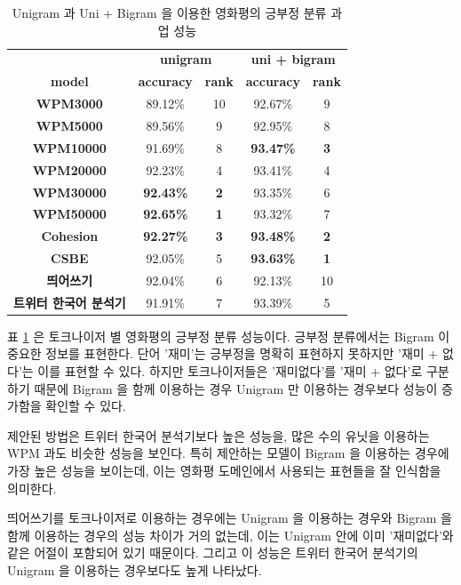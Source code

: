 \documentclass[oneside, ko,phd]{snuthesis_utf8_kor}
\begin{document}
\begin{table}[ht]
\centering
\caption{Unigram 과 Uni + Bigram 을 이용한 영화평의 긍부정 분류 과업 성능}
\label{tab:sentiment_performance}
\begin{tabular}{|
>{}c |c|c|c|c|}
\hline
 & \multicolumn{2}{c|}{\textbf{unigram}} & \multicolumn{2}{c|}{\textbf{uni + bigram}} \\ \cline{2-5} 
\multirow{-2}{*}{\textbf{model}} & \textbf{accuracy} & \textbf{rank} & \textbf{accuracy} & \textbf{rank} \\ \hline
\textbf{WPM3000} & 89.12\% & 10 & 92.67\% & 9 \\ \hline
\textbf{WPM5000} & 89.56\% & 9 & 92.95\% & 8 \\ \hline
\textbf{WPM10000} & 91.69\% & 8 & {\textbf{93.47\%}} & {\textbf{3}} \\ \hline
\textbf{WPM20000} & 92.23\% & 4 & 93.41\% & 4 \\ \hline
\textbf{WPM30000} & {\textbf{92.43\%}} & {\textbf{2}} & 93.35\% & 6 \\ \hline
\textbf{WPM50000} & {\textbf{92.65\%}} & {\textbf{1}} & 93.32\% & 7 \\ \hline
\textbf{Cohesion} & {\textbf{92.27\%}} & {\textbf{3}} & {\textbf{93.48\%}} & {\textbf{2}} \\ \hline
\textbf{CSBE} & 92.05\% & 5 & {\textbf{93.63\%}} & {\textbf{1}} \\ \hline
\textbf{띄어쓰기} & 92.04\% & 6 & 92.13\% & 10 \\ \hline
\textbf{트위터 한국어 분석기} & 91.91\% & 7 & 93.39\% & 5 \\ \hline
\end{tabular}%
\end{table}

표 \ref{tab:sentiment_performance} 은 토크나이저 별 영화평의 긍부정 분류 성능이다.
긍부정 분류에서는 Bigram 이 중요한 정보를 표현한다.
단어 '재미'는 긍부정을 명확히 표현하지 못하지만 '재미 + 없다'는 이를 표현할 수 있다.
하지만 토크나이저들은 '재미없다'를 '재미 + 없다'로 구분하기 때문에 Bigram 을 함께 이용하는 경우 Unigram 만 이용하는 경우보다 성능이 증가함을 확인할 수 있다.

제안된 방법은 트위터 한국어 분석기보다 높은 성능을, 많은 수의 유닛을 이용하는 WPM 과도 비슷한 성능을 보인다.
특히 제안하는 모델이 Bigram 을 이용하는 경우에 가장 높은 성능을 보이는데, 이는 영화평 도메인에서 사용되는 표현들을 잘 인식함을 의미한다.

띄어쓰기를 토크나이저로 이용하는 경우에는 Unigram 을 이용하는 경우와 Bigram 을 함께 이용하는 경우의 성능 차이가 거의 없는데, 이는 Unigram 안에 이미 '재미없다'와 같은 어절이 포함되어 있기 때문이다.
그리고 이 성능은 트위터 한국어 분석기의 Unigram 을 이용하는 경우보다도 높게 나타났다.
\end{document}
